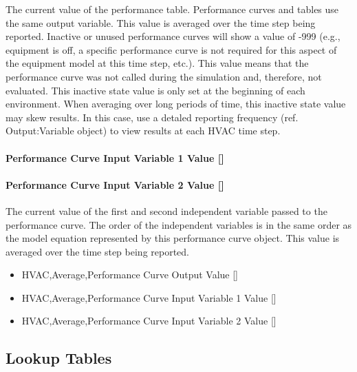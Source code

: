 The current value of the performance table. Performance curves and tables use the same output variable. This value is averaged over the time step being reported. Inactive or unused performance curves will show a value of -999 (e.g., equipment is off, a specific performance curve is not required for this aspect of the equipment model at this time step, etc.). This value means that the performance curve was not called during the simulation and, therefore, not evaluated. This inactive state value is only set at the beginning of each environment. When averaging over long periods of time, this inactive state value may skew results. In this case, use a detaled reporting frequency (ref. Output:Variable object) to view results at each HVAC time step.

\paragraph{\texorpdfstring{Performance Curve Input Variable 1 Value {[]}}{Performance Curve Input Variable 1 Value }}\label{performance-curve-input-variable-1-value-1}

\paragraph{\texorpdfstring{Performance Curve Input Variable 2 Value {[]}}{Performance Curve Input Variable 2 Value }}\label{performance-curve-input-variable-2-value}

The current value of the first and second independent variable passed to the performance curve. The order of the independent variables is in the same order as the model equation represented by this performance curve object. This value is averaged over the time step being reported.

\begin{itemize}
\item
  HVAC,Average,Performance Curve Output Value {[]}
\item
  HVAC,Average,Performance Curve Input Variable 1 Value {[]}
\item
  HVAC,Average,Performance Curve Input Variable 2 Value {[]}
\end{itemize}

\subsection{Lookup Tables}\label{lookup-tables}

